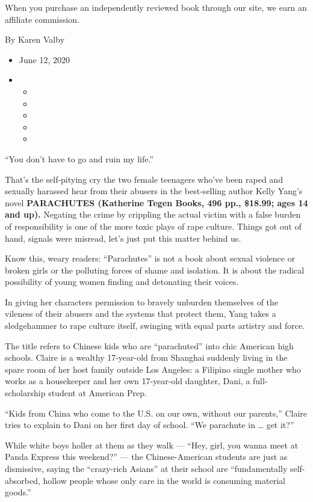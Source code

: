 When you purchase an independently reviewed book through our site, we
earn an affiliate commission.

By Karen Valby

\begin{itemize}
\item
  June 12, 2020
\item
  \begin{itemize}
  \item
  \item
  \item
  \item
  \item
  \end{itemize}
\end{itemize}

``You don't have to go and ruin my life.''

That's the self-pitying cry the two female teenagers who've been raped
and sexually harassed hear from their abusers in the best-selling author
Kelly Yang's novel \textbf{PARACHUTES (Katherine Tegen Books, 496 pp.,
\$18.99; ages 14 and up).} Negating the crime by crippling the actual
victim with a false burden of responsibility is one of the more toxic
plays of rape culture. Things got out of hand, signals were misread,
let's just put this matter behind us.

Know this, weary readers: ``Parachutes'' is not a book about sexual
violence or broken girls or the polluting forces of shame and isolation.
It is about the radical possibility of young women finding and
detonating their voices.

In giving her characters permission to bravely unburden themselves of
the vileness of their abusers and the systems that protect them, Yang
takes a sledgehammer to rape culture itself, swinging with equal parts
artistry and force.

The title refers to Chinese kids who are ``parachuted'' into chic
American high schools. Claire is a wealthy 17-year-old from Shanghai
suddenly living in the spare room of her host family outside Los
Angeles: a Filipino single mother who works as a housekeeper and her own
17-year-old daughter, Dani, a full-scholarship student at American Prep.

``Kids from China who come to the U.S. on our own, without our
parents,'' Claire tries to explain to Dani on her first day of school.
``We parachute in \ldots{} get it?''

While white boys holler at them as they walk --- ``Hey, girl, you wanna
meet at Panda Express this weekend?'' --- the Chinese-American students
are just as dismissive, saying the ``crazy-rich Asians'' at their school
are ``fundamentally self-absorbed, hollow people whose only care in the
world is consuming material goods.''

